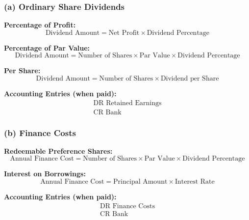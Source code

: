 \subsubsection*{(a) Ordinary Share Dividends}

\textbf{Percentage of Profit:}
\[
\text{Dividend Amount} = \text{Net Profit} \times \text{Dividend Percentage}
\]

\textbf{Percentage of Par Value:}
\[
\text{Dividend Amount} = \text{Number of Shares} \times \text{Par Value} \times \text{Dividend Percentage}
\]

\textbf{Per Share:}
\[
\text{Dividend Amount} = \text{Number of Shares} \times \text{Dividend per Share}
\]

\textbf{Accounting Entries (when paid):}
\[
\begin{aligned}
\text{DR Retained Earnings} \\
\text{CR Bank}
\end{aligned}
\]

\subsubsection*{(b) Finance Costs}

\textbf{Redeemable Preference Shares:}
\[
\text{Annual Finance Cost} = \text{Number of Shares} \times \text{Par Value} \times \text{Dividend Percentage}
\]

\textbf{Interest on Borrowings:}
\[
\text{Annual Finance Cost} = \text{Principal Amount} \times \text{Interest Rate}
\]

\textbf{Accounting Entries (when paid):}
\[
\begin{aligned}
\text{DR Finance Costs} \\
\text{CR Bank}
\end{aligned}
\]

